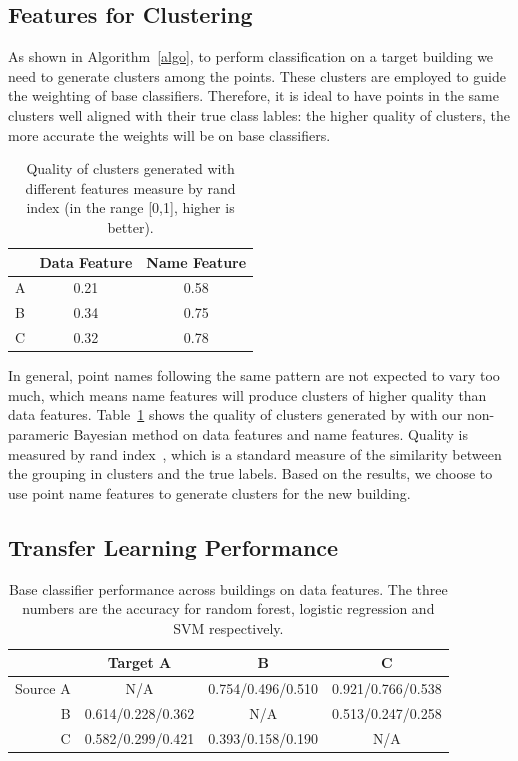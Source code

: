 \subsection{Features for Clustering}
As shown in Algorithm~\ref{algo}, to perform classification on a target building we need to generate clusters among the points.
These clusters are employed to guide the weighting of base classifiers. Therefore, it is ideal to have points in the same clusters 
well aligned with their true class lables: the higher quality of clusters, the more accurate the weights will be on base classifiers.


\begin{table}[h]
\centering
\begin{tabular}{l|c|c}
\hline
                & Data Feature & Name Feature \\ \hline\hline
A & 0.21       & 0.58       \\
B & 0.34       & 0.75       \\
C & 0.32       & 0.78       \\ \hline
\end{tabular}
\caption{Quality of clusters generated with different features measure by rand index (in the range [0,1], higher is better).}
\label{quality}
\end{table}


In general, point names following the same pattern are not expected to vary too much, which means name features will produce clusters of higher quality than data features.
Table~\ref{quality} shows the quality of clusters generated by with our non-parameric Bayesian method on data features and name features. 
Quality is measured by rand index~\cite{rand}, which is a standard measure of the similarity between the grouping in clusters and the true labels.
Based on the results, we choose to use point name features to generate clusters for the new building. 


\subsection{Transfer Learning Performance}
\begin{table}[]
\centering
\begin{tabular}{r|c|c|c}
\hline
 & Target A     & B     & C     \\ \hline\hline
Source A & N/A   & 0.754/0.496/0.510 & 0.921/0.766/0.538 \\ \hline
B & 0.614/0.228/0.362 & N/A   & 0.513/0.247/0.258 \\ \hline
C & 0.582/0.299/0.421 & 0.393/0.158/0.190 & N/A   \\ \hline
\end{tabular}
\caption{Base classifier performance across buildings on data features. The three numbers are the accuracy for random forest, logistic regression and SVM respectively.}
\label{acc_base}
\end{table}


